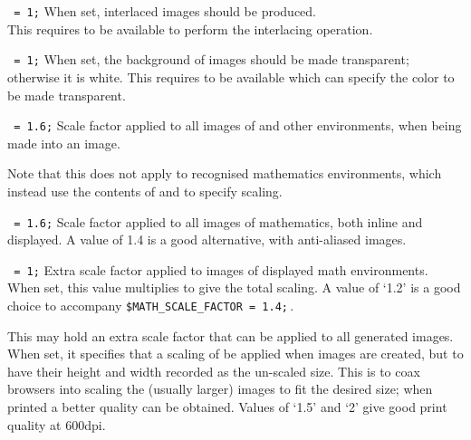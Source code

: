 \begin{htmllist}
\item [\fn{\$INTERLACE}\texttt{ = 1;}\label{interlace}]
When set, interlaced images should be produced.\\
This requires  to be available
to perform the interlacing operation.


\item [\fn{\$TRANSPARENT\_FIGURES}\texttt{ = 1;}\label{transfigs}]
When set, the background of images should be made transparent;
otherwise it is white.\html{\\}
This requires  %
to be available which can specify the color to be made transparent.


\item [\fn{\$FIGURE\_SCALE\_FACTOR}\texttt{ = 1.6;}\label{figscale}]
Scale factor applied to all images of  and other environments,
when being made into an image.

\smallskip\noindent
Note that this does not apply to recognised mathematics environments,
which instead use the contents of 
and  to specify scaling.


\item [\fn{\$MATH\_SCALE\_FACTOR}\texttt{ = 1.6;}\label{mathscale}]
Scale factor applied to all images of mathematics, both inline
and displayed.
A value of 1.4 is a good alternative, with anti-aliased images.


\item [\fn{\$DISP\_SCALE\_FACTOR}\texttt{ = 1;}\label{dispscale}]
Extra scale factor applied to images of displayed math environments.\html{\\}
When set, this value multiplies 
to give the total scaling.
A value of `1.2' is a good choice to accompany \verb|$MATH_SCALE_FACTOR = 1.4;|\,.


\item [\fn{\$EXTRA\_IMAGE\_SCALE}\label{ximagescale}]
This may hold an extra scale factor that can be applied to all generated images.\html{\\}
When set, it specifies that a scaling of  be applied
when images are created, but to have their height and width recorded
as the un-scaled size. This is to coax browsers into scaling the (usually larger)
images to fit the desired size; when printed a better quality can be obtained.
Values of `1.5' and `2' give good print quality at 600dpi.



\end{htmllist}
